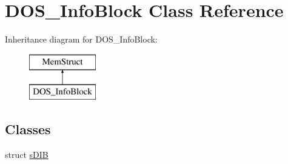 \hypertarget{classDOS__InfoBlock}{\section{D\-O\-S\-\_\-\-Info\-Block Class Reference}
\label{classDOS__InfoBlock}
}
Inheritance diagram for D\-O\-S\-\_\-\-Info\-Block\-:\begin{figure}[H]
\begin{center}
\leavevmode
\includegraphics[height=2.000000cm]{classDOS__InfoBlock}
\end{center}
\end{figure}
\subsection*{Classes}
\begin{DoxyCompactItemize}
\item 
struct \hyperlink{structDOS__InfoBlock_1_1sDIB}{s\-D\-I\-B}
\end{DoxyCompactItemize}
